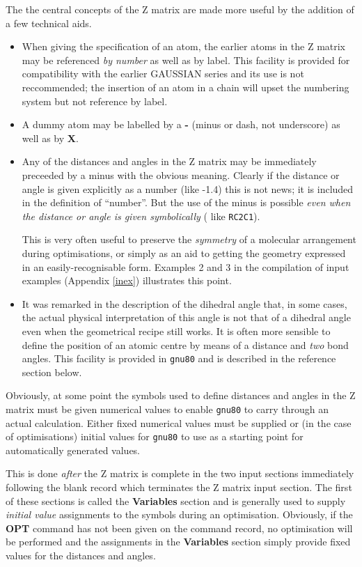 The  the central concepts of the Z matrix
are made more useful by the addition of a few technical
aids.
\begin{itemize}
\item When giving the specification of an atom, the earlier atoms in
the Z matrix may be referenced {\em by number} as well as by label.
This facility is provided for compatibility with the earlier GAUSSIAN
series and its use is not reccommended; the insertion of an atom in a chain
will upset the numbering system but not reference by label.
\item A dummy atom may be labelled by a {\bf -} (minus or dash, not
underscore) as well as by {\bf X}.
\item Any of the distances and angles in the Z matrix may be immediately
preceeded by a minus with the obvious meaning. Clearly if the distance
or angle is given explicitly as a number (like -1.4) this is not news;
it is included in the definition of ``number''. But the use
of the minus is possible {\em even when the distance or angle is
given symbolically} ( like {\tt RC2C1}).

This is very often useful to preserve the {\em symmetry} of a molecular
arrangement during optimisations, or simply as an aid to getting
the geometry expressed in an easily-recognisable form. Examples 2 and 3
in the compilation of input examples (Appendix \ref{inex}) illustrates
this point.
\item It was remarked in the description of the dihedral angle
that, in some cases, the actual physical interpretation of this angle
is not that of a dihedral angle even when the geometrical recipe
still works. It is often more sensible to define the position of
an atomic centre by means of a distance and {\em two} bond angles.
This facility is provided in {\tt gnu80} and is described in the reference
section below.
\end{itemize}
Obviously, at some point the symbols used to define distances and angles
in the Z matrix must be given numerical values to enable {\tt gnu80}
to carry through an actual calculation. Either fixed numerical values
must be supplied or (in the case of optimisations) initial values
for {\tt gnu80} to use as a starting point for automatically generated
values.

This is done {\em after} the Z matrix is complete in the two input
sections immediately following the blank record which terminates
the Z matrix input section. The first of these sections is called the
{\bf Variables} section and is generally used to supply {\em initial
value} assignments to the symbols during an optimisation. Obviously,
if the {\bf OPT} command has not been given on the command record, no
optimisation will be performed and the assignments in the {\bf Variables}
section simply provide fixed values for the distances and angles.

